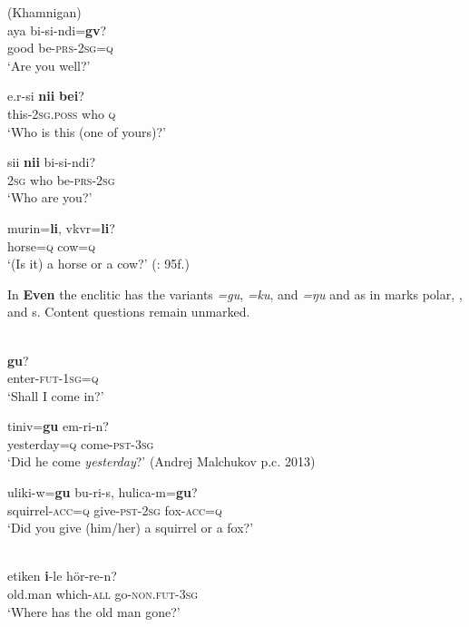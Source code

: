 \newpage 
\ea%
    \label{ex:tungu:10}
     (Khamnigan)\\
    \ea
    \gll aya  bi-si-ndi=\textbf{{gv}}?\\
    good  be-\textsc{prs}-2\textsc{sg}=\textsc{q}\\
    \glt ‘Are you well?’
    
    \ex
    \gll e.r-si \textbf{{nii}} \textbf{{bei}}?\\
    this-2\textsc{sg}.\textsc{poss}  who  \textsc{q}\\
    \glt ‘Who is this (one of yours)?’
    
    \ex
    \gll sii \textbf{{nii}} bi-si-ndi?\\
    2\textsc{sg}  who  be-\textsc{prs}-2\textsc{sg}\\
    \glt ‘Who are you?’
    
    \ex
    \gll murin=\textbf{{li}},  vkvr=\textbf{{li}}?\\
    horse=\textsc{q}  cow=\textsc{q}\\
    \glt ‘(Is it) a horse or a cow?’ (\citealt{Janhunen1991}: 95f.)\z\z

In \textbf{Even} the enclitic has the variants \textit{=gu}, \textit{=ku}, and \textit{=ŋu} \citep[19]{Malchukov1995} and as in  marks polar, , and s. Content questions remain unmarked.

\ea%
    \label{ex:tungu:11}
    \\
    \ea
    \textbf{{gu}}?\\
    enter-\textsc{fut}-1\textsc{sg}=\textsc{q}\\
    \glt ‘Shall I come in?’ \citep[165]{Malchukov2001}
    
    \ex
    \gll tiniv=\textbf{{gu}} {em-}{ri-}{n?}\\
    yesterday=\textsc{q}  come-\textsc{pst}-3\textsc{sg}\\
    \glt ‘Did he come \textit{yesterday}?’ (Andrej Malchukov p.c. 2013)
    
    \ex
    \gll uliki-w=\textbf{{gu}} bu-ri-s,    hulica-m=\textbf{{gu}}?\\
    squirrel-\textsc{acc}=\textsc{q}  give-\textsc{pst}-2\textsc{sg}  fox-\textsc{acc}=\textsc{q}\\
    \glt ‘Did you give (him/her) a squirrel or a fox?’ \citep[111]{Benzing1955}\z\z

\ea%
    \label{ex:tungu:12}
    \\
    \gll etiken \textbf{{i}}-le    hör-re-n?\\
    old.man  which-\textsc{all}  go-\textsc{non}.\textsc{fut}-3\textsc{sg}\\
    \glt ‘Where has the old man gone?’ \citep[19]{Malchukov1995}
    \z

